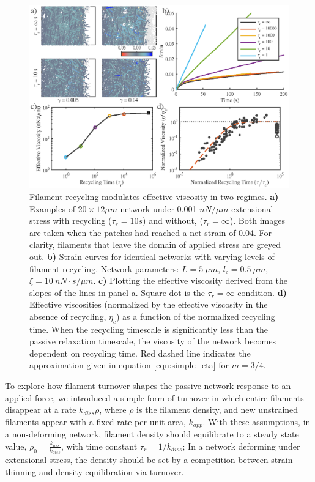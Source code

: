 \documentclass[10pt,letterpaper]{article}
\begin{document}
\begin{figure}[h!]
	\centering
	\includegraphics[width=\hsize]{figures/figure4}
	\caption{\label{fig:passive_rec}  Filament recycling modulates effective viscosity in two regimes. \textbf{a)} Examples of $20 \times 12 \mu m$ network under 0.001 $nN/\mu m$ extensional stress with recycling ($\tau_r=10 s$) and without, ($\tau_r=\infty$).  Both images are taken when the patches had reached a net strain of 0.04.  For clarity, filaments that leave the domain of applied stress are greyed out. \textbf{b)} Strain curves for identical networks with varying levels of filament recycling.  Network parameters: $L=5\: \mu m$, $l_c=0.5\: \mu m$, $\xi=10\: nN\cdot s/\mu m$. \textbf{c)}  Plotting the effective viscosity derived from the slopes of the lines in panel a.  Square dot is the $\tau_r=\infty$ condition.  \textbf{d)} Effective viscosities (normalized by the effective viscosity in the absence of recycling, $\eta_c$) as a function of the normalized recycling time. When the recycling timescale is significantly less than the passive relaxation timescale, the viscosity of the network becomes dependent on recycling time. Red dashed line indicates the approximation given in equation \ref{eqn:simple_eta} for $m=3/4$.}
\end{figure}

To explore how filament turnover shapes the passive network response to an applied force, we introduced a simple form of turnover in which entire filaments disappear at a rate $k_{diss}\rho$, where $\rho$ is the filament density, and new unstrained filaments appear with a fixed rate per unit area, $k_{app}$. With these assumptions, in a non-deforming network,  filament density should equilibrate to a steady state value, $\rho_0 = \frac {k_{ass}}{k_{diss}}$, with time constant $\tau_r = 1/k_{diss}$;  In a network deforming under extensional stress, the density should be set by a competition between strain thinning and density equilibration via turnover. 
\end{document}
